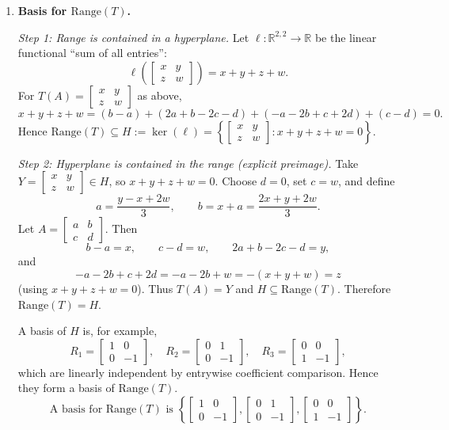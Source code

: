 \documentclass[12pt]{article}
\newcommand{\R}{\mathbb{R}}
\begin{document}
\begin{enumerate}[label=(\alph*)]
\item \textbf{Basis for $\mathrm{Range}(T)$.}

\emph{Step 1: Range is contained in a hyperplane.}
Let $\ell:\R^{2,2}\to\R$ be the linear functional ``sum of all entries'':
\[
\ell\!\left(\begin{bmatrix}x&y\\z&w\end{bmatrix}\right)=x+y+z+w.
\]
For $T(A)=\begin{bmatrix}x&y\\z&w\end{bmatrix}$ as above,
\[
x+y+z+w=(b-a)+(2a+b-2c-d)+(-a-2b+c+2d)+(c-d)=0.
\]
Hence $\mathrm{Range}(T)\subseteq H:=\ker(\ell)=\left\{\begin{bmatrix}x&y\\z&w\end{bmatrix}:x+y+z+w=0\right\}$.

\emph{Step 2: Hyperplane is contained in the range (explicit preimage).}
Take $Y=\begin{bmatrix}x&y\\z&w\end{bmatrix}\in H$, so $x+y+z+w=0$.
Choose $d=0$, set $c=w$, and define
\[
a=\frac{y-x+2w}{3},\qquad b=x+a=\frac{2x+y+2w}{3}.
\]
Let $A=\begin{bmatrix}a&b\\c&d\end{bmatrix}$. Then
\[
b-a=x,\qquad c-d=w,\qquad 2a+b-2c-d=y,
\]
and
\[
-a-2b+c+2d=-a-2b+w=-(x+y+w)=z
\]
(using $x+y+z+w=0$). Thus $T(A)=Y$ and $H\subseteq\mathrm{Range}(T)$.
Therefore $\mathrm{Range}(T)=H$.

A basis of $H$ is, for example,
\[
R_1=\begin{bmatrix}1&0\\0&-1\end{bmatrix},\quad
R_2=\begin{bmatrix}0&1\\0&-1\end{bmatrix},\quad
R_3=\begin{bmatrix}0&0\\1&-1\end{bmatrix},
\]
which are linearly independent by entrywise coefficient comparison. Hence they form a basis of $\mathrm{Range}(T)$.
\[
\boxed{\,\text{A basis for }\mathrm{Range}(T)\text{ is }\left\{
\begin{bmatrix}1&0\\0&-1\end{bmatrix},
\begin{bmatrix}0&1\\0&-1\end{bmatrix},
\begin{bmatrix}0&0\\1&-1\end{bmatrix}
\right\}.\,}
\]


\end{enumerate}
\end{document}

